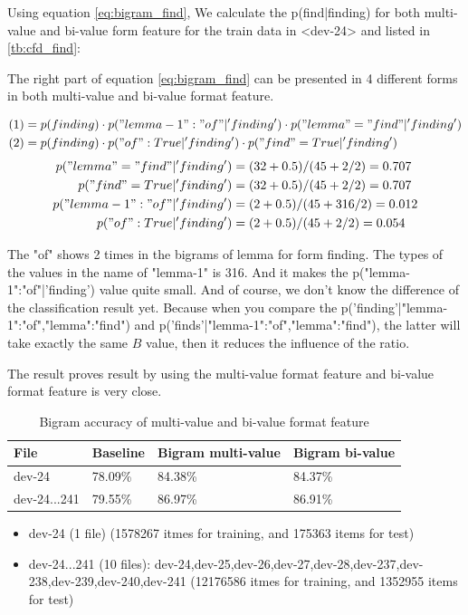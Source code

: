 \documentclass[a4paper]{article}
\begin{document}
Using equation \ref{eq:bigram_find}, We calculate the p(find|finding) for both multi-value and bi-value form feature for the train data in <dev-24> and listed in \ref{tb:cfd_find}:

The right part of equation \ref{eq:bigram_find} can be presented in 4 different forms in both multi-value and bi-value format feature. 

\begin{align*}
&(1)=p(finding) \cdot p("lemma-1":"of"|'finding') \cdot p("lemma"="find"|'finding') \\
&(2)=p(finding) \cdot p("of":True|'finding') \cdot p("find"=True|'finding') 
\end{align*}
\begin{align*}
p("lemma"="find"|'finding') &= (32+0.5)/(45+2/2) = 0.707 \\
p("find"=True|'finding') &= (32+0.5)/(45+2/2) = 0.707 \\
p("lemma-1":"of"|'finding') &= (2+0.5)/(45+316/2) = 0.012 \\
p("of":True|'finding') &= (2+0.5)/(45+2/2) = 0.054 
\end{align*}

The "of" shows 2 times in the bigrams of lemma for form finding. The types of the values in the name of "lemma-1" is 316. And it makes the p("lemma-1":"of"|'finding') value quite small. 
And of course, we don't know the difference of the classification result yet. Because when you compare the p('finding'|"lemma-1":"of","lemma":"find") and p('finds'|"lemma-1":"of","lemma":"find"), the latter will take exactly the same $B$ value, then it reduces the influence of the ratio.

The result proves result by using the multi-value format feature and bi-value format feature is very close.


\begin{table}[htp]
\centering
\begin{tabular}{|l|l|l|l|}
\hline
File           & Baseline  & Bigram multi-value & Bigram bi-value \\ \hline
dev-24         & 78.09\%    & 84.38\%            & 84.37\%         \\ \hline
dev-24...241   & 79.55\%    & 86.97\%            & 86.91\%         \\ \hline
\end{tabular}
\caption{Bigram accuracy of multi-value and bi-value format feature}
\label{bigram_nb}
\end{table}
\begin{itemize}
\item dev-24 (1 file) (1578267 itmes for training, and 175363 items for test)
\item dev-24...241 (10 files): dev-24,dev-25,dev-26,dev-27,dev-28,dev-237,dev-238,dev-239,dev-240,dev-241 (12176586 itmes for training, and 1352955 items for test)
\end{itemize}
\end{document}
